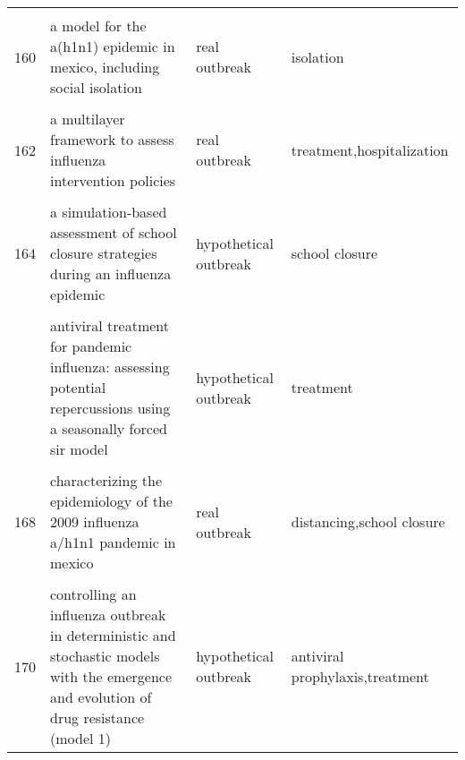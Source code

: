 \documentclass[
]{article}
\begin{document}
\begin{landscape}
\begin{longtable}{l>{\raggedright\arraybackslash}p{3cm}l>{\raggedright\arraybackslash}p{8cm}}
\cellcolor{gray!6}{159} & \cellcolor{gray!6}{a deterministic resource scheduling model in epidemic control: a case study} & \cellcolor{gray!6}{real outbreak} & \cellcolor{gray!6}{vaccination}\\
160 & a model for the a(h1n1) epidemic in mexico, including social isolation & real outbreak & isolation\\
\addlinespace
\cellcolor{gray!6}{161} & \cellcolor{gray!6}{a model to evaluate mass vaccination against pneumococcus as a countermeasure against pandemic influenza} & \cellcolor{gray!6}{real outbreak} & \cellcolor{gray!6}{vaccination}\\
162 & a multilayer framework to assess influenza intervention policies & real outbreak & treatment,hospitalization\\
\cellcolor{gray!6}{163} & \cellcolor{gray!6}{a note on the use of optimal control on a discrete time model of influenza dynamics} & \cellcolor{gray!6}{hypothetical outbreak} & \cellcolor{gray!6}{distancing,antiviral treatment}\\
164 & a simulation-based assessment of school closure strategies during an influenza epidemic & hypothetical outbreak & school closure\\
\cellcolor{gray!6}{165} & \cellcolor{gray!6}{agent-based modeling of the spread of influenza-like illness in an emergency department: a simulation study} & \cellcolor{gray!6}{hypothetical outbreak} & \cellcolor{gray!6}{face masks,pallative care,treatment}\\
\addlinespace
166 & antiviral treatment for pandemic influenza: assessing potential repercussions using a seasonally forced sir model & hypothetical outbreak & treatment\\
\cellcolor{gray!6}{167} & \cellcolor{gray!6}{can antiviral drugs contain pandemic influenza transmission?} & \cellcolor{gray!6}{real outbreak} & \cellcolor{gray!6}{antiviral prophylaxis}\\
168 & characterizing the epidemiology of the 2009 influenza a/h1n1 pandemic in mexico & real outbreak & distancing,school closure\\
\cellcolor{gray!6}{169} & \cellcolor{gray!6}{cholera epidemic in haiti, 2010: using a transmission model to explain spatial spread of disease and identify optimal control interventions} & \cellcolor{gray!6}{real outbreak} & \cellcolor{gray!6}{hygiene,vaccination}\\
170 & controlling an influenza outbreak in deterministic and stochastic models with the emergence and evolution of drug resistance (model 1) & hypothetical outbreak & antiviral prophylaxis,treatment\\

\end{longtable}
\end{landscape}
\end{document}
